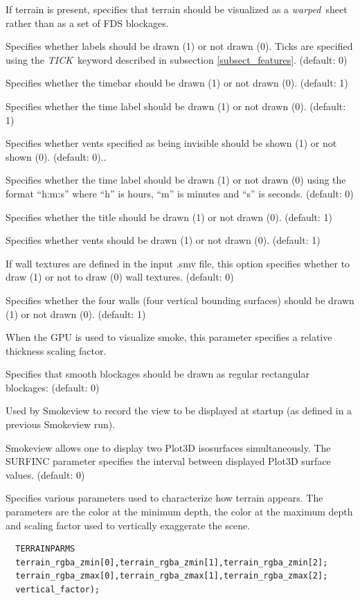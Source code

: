 \documentclass[11pt,twoside]{book}
\newcommand{\hitem}[1]{\item[{\bf #1} \hfill]}
\begin{document}
\hitem{SHOWTERRAIN} If terrain is present, specifies that terrain should be visualized as a {\em warped}\ sheet
rather than as a set of FDS blockages.

\hitem{SHOWTICKS} Specifies whether labels should be drawn (1) or
not drawn (0).  Ticks are specified using the {\em TICK}\ keyword
described in subsection \ref{subsect_features}. (default: 0)

\hitem{SHOWTIMEBAR}Specifies whether the timebar should be drawn
(1) or not drawn (0). (default: 1)

\hitem{SHOWTIMELABEL} Specifies whether the time label should be
drawn (1) or not drawn (0). (default: 1)

\hitem{SHOWTRANSPARENTVENTS} Specifies whether vents specified as being invisible should be
shown (1) or not shown (0). (default: 0)..

\hitem{SHOWHMSTIMELABEL}Specifies whether the time label should be
drawn (1) or not drawn (0) using the format ``h:m:s'' where ``h''
is hours, ``m'' is minutes and ``s'' is seconds.  (default: 0)

\hitem{SHOWTITLE}Specifies whether
the title should be drawn (1) or not drawn (0).
(default: 1)

\hitem{SHOWVENTS} Specifies whether vents should be drawn
(1) or not drawn (0).  (default: 1)

\hitem{SHOWALLTEXTURES} If wall textures are defined in the input .smv file, this
option specifies whether to draw (1) or not to draw (0) wall textures.
(default: 0)


\hitem{SHOWWALLS}Specifies whether
the four walls (four vertical bounding surfaces) should be drawn (1) or not drawn (0).
(default: 1)

\hitem{SMOKERTHICK} When the GPU is used to visualize smoke, this parameter specifies a
relative thickness scaling factor.

\hitem{SMOOTHBLOCKSOLID}  Specifies that smooth blockages should be drawn as regular rectangular blockages: (default: 0)

\hitem{STARTUPVIEW}Used by Smokeview to record the view to be
displayed at startup (as defined in a previous Smokeview run).

\hitem{SURFINC}Smokeview allows one to display two Plot3D
isosurfaces simultaneously.  The SURFINC parameter specifies the
interval between displayed Plot3D surface values. (default: 0)

\hitem{TERRAINPARMS} Specifies various parameters used to characterize
how terrain appears.  The parameters are the color at the minimum depth,
the color at the maximum depth and scaling factor used to vertically exaggerate
the scene.
\begin{lstlisting}
  TERRAINPARMS
  terrain_rgba_zmin[0],terrain_rgba_zmin[1],terrain_rgba_zmin[2];
  terrain_rgba_zmax[0],terrain_rgba_zmax[1],terrain_rgba_zmax[2];
  vertical_factor);
\end{lstlisting}
\end{document}
